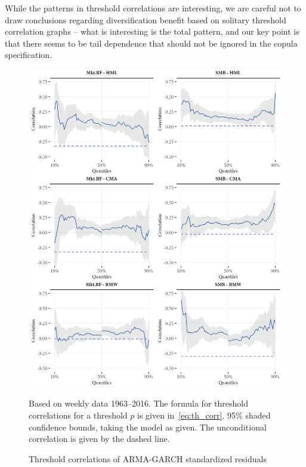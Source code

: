 While the patterns in threshold correlations are interesting, we are careful not to draw conclusions regarding diversification benefit based on solitary threshold correlation graphs -- what is interesting is the total pattern, and our key point is that there seems to be tail dependence that should not be ignored in the copula specification.

\begin{figure}[H]
  \centering
  \includegraphics[scale=1]{graphics/threshold1.png}
  \footnotesize
  \caption{Threshold correlations of ARMA-GARCH standardized residuals}
  \begin{longcaption}
    Based on weekly data 1963--2016. The formula for threshold correlations for a threshold $p$ is given in~\autoref{eq:th_corr}. 95\% shaded confidence bounds, taking the model as given. The unconditional correlation is given by the dashed line.
  \end{longcaption}
  \label{fig:threshold1}
\end{figure}

